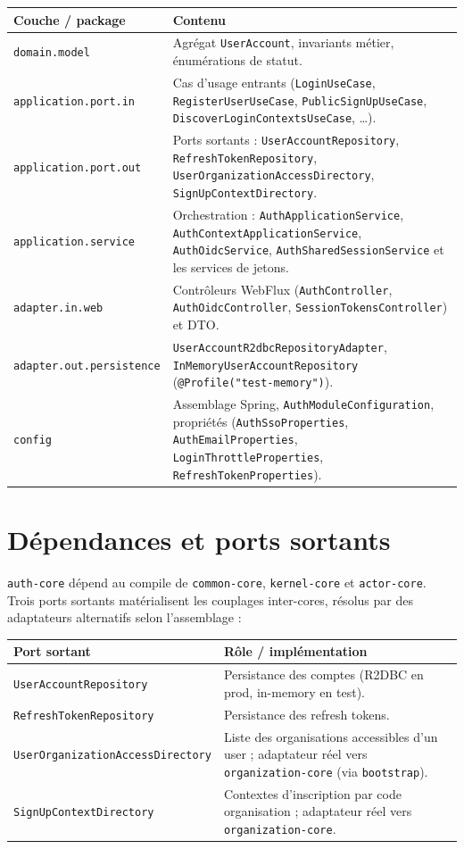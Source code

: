 \documentclass[11pt,a4paper,oneside]{report}
\newcommand{\code}[1]{\texttt{\small #1}}
\begin{document}
\begin{center}
\begin{tabular}{@{}p{5.2cm}p{8.6cm}@{}}
\toprule
\textbf{Couche / package} & \textbf{Contenu}\\
\midrule
\code{domain.model} & Agrégat \code{UserAccount}, invariants métier, énumérations de statut.\\
\code{application.port.in} & Cas d'usage entrants (\code{LoginUseCase}, \code{RegisterUserUseCase}, \code{PublicSignUpUseCase}, \code{DiscoverLoginContextsUseCase}, \dots).\\
\code{application.port.out} & Ports sortants : \code{UserAccountRepository}, \code{RefreshTokenRepository}, \code{UserOrganizationAccessDirectory}, \code{SignUpContextDirectory}.\\
\code{application.service} & Orchestration : \code{AuthApplicationService}, \code{AuthContextApplicationService}, \code{AuthOidcService}, \code{AuthSharedSessionService} et les services de jetons.\\
\code{adapter.in.web} & Contrôleurs WebFlux (\code{AuthController}, \code{AuthOidcController}, \code{SessionTokensController}) et DTO.\\
\code{adapter.out.persistence} & \code{UserAccountR2dbcRepositoryAdapter}, \code{InMemoryUserAccountRepository} (\code{@Profile("test-memory")}).\\
\code{config} & Assemblage Spring, \code{AuthModuleConfiguration}, propriétés (\code{AuthSsoProperties}, \code{AuthEmailProperties}, \code{LoginThrottleProperties}, \code{RefreshTokenProperties}).\\
\bottomrule
\end{tabular}
\end{center}

\section{Dépendances et ports sortants}
\code{auth-core} dépend au compile de \code{common-core}, \code{kernel-core} et
\code{actor-core}. Trois ports sortants matérialisent les couplages inter-cores, résolus par
des adaptateurs alternatifs selon l'assemblage :

\begin{center}
\begin{tabular}{@{}p{5.4cm}p{8.4cm}@{}}
\toprule
\textbf{Port sortant} & \textbf{Rôle / implémentation}\\
\midrule
\code{UserAccountRepository} & Persistance des comptes (R2DBC en prod, in-memory en test).\\
\code{RefreshTokenRepository} & Persistance des refresh tokens.\\
\code{UserOrganizationAccess\allowbreak Directory} & Liste des organisations accessibles d'un user ; adaptateur réel vers \code{organization-core} (via \code{bootstrap}).\\
\code{SignUpContextDirectory} & Contextes d'inscription par code organisation ; adaptateur réel vers \code{organization-core}.\\
\bottomrule
\end{tabular}
\end{center}
\end{document}
